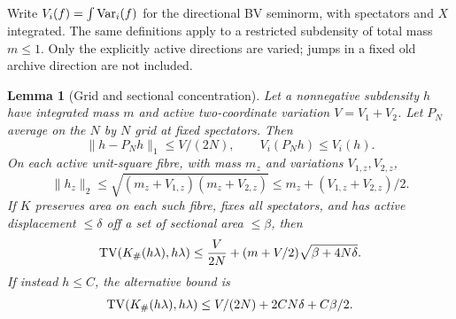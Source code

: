 \documentclass[11pt]{article}
\numberwithin{equation}{section}
\newtheorem{lemma}[theorem]{Lemma}
\theoremstyle{definition}
\theoremstyle{remark}
\begin{document}
Write $V_i(f)=\int\operatorname{Var}_i(f)$ for the directional BV seminorm, with
spectators and $X$ integrated. The same definitions apply to a restricted
subdensity of total mass $m\leq1$. Only the explicitly active directions
are varied; jumps in a fixed old archive direction are not included.

\begin{lemma}[Grid and sectional concentration]\label{p1p:lem:grid}
Let a nonnegative subdensity $h$ have integrated mass $m$ and active
two-coordinate variation $V=V_1+V_2$. Let $P_N$ average on the $N$ by $N$
grid at fixed spectators. Then
\begin{equation}\label{p1p:eq:grid}
 \|h-P_Nh\|_1\leq V/(2N),\qquad V_i(P_Nh)\leq V_i(h).
\end{equation}
On each active unit-square fibre, with mass $m_z$ and variations
$V_{1,z},V_{2,z}$,
\begin{equation}\label{p1p:eq:sectionL2}
 \|h_z\|_2\leq\sqrt{(m_z+V_{1,z})(m_z+V_{2,z})}
 \leq m_z+(V_{1,z}+V_{2,z})/2.
\end{equation}
If $K$ preserves area on each such fibre, fixes all spectators, and has
active displacement $\leq\delta$ off a set of sectional area $\leq\beta$,
then
\begin{equation}\label{p1p:eq:capfreegrid}
 \operatorname{TV}(K_\#(h\lambda),h\lambda)
 \leq \frac{V}{2N}+(m+V/2)\sqrt{\beta+4N\delta}.
\end{equation}
If instead $h\leq C$, the alternative bound is
\begin{equation}\label{p1p:eq:capgrid}
 \operatorname{TV}(K_\#(h\lambda),h\lambda)
 \leq V/(2N)+2CN\delta+C\beta/2.
\end{equation}
\end{lemma}
\end{document}
